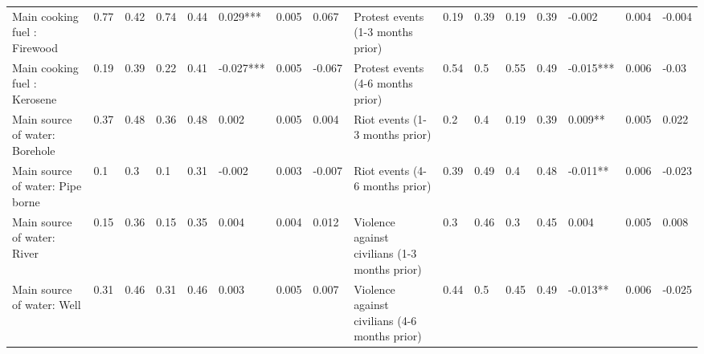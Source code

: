 \begin{table}[H]
{\begin{tabular}{@{}llllllll|llllllll@{}}
Main cooking fuel : Firewood & 0.77 & 0.42 & 0.74 & 0.44 & 0.029*** & 0.005 & 0.067 & Protest events (1-3 months prior) & 0.19 & 0.39 & 0.19 & 0.39 & -0.002 & 0.004 & -0.004 \\
Main cooking fuel : Kerosene & 0.19 & 0.39 & 0.22 & 0.41 & -0.027*** & 0.005 & -0.067 & Protest events (4-6 months prior) & 0.54 & 0.5 & 0.55 & 0.49 & -0.015*** & 0.006 & -0.03 \\
Main source of water: Borehole & 0.37 & 0.48 & 0.36 & 0.48 & 0.002 & 0.005 & 0.004 & Riot events (1-3 months prior) & 0.2 & 0.4 & 0.19 & 0.39 & 0.009** & 0.005 & 0.022 \\
Main source of water: Pipe borne & 0.1 & 0.3 & 0.1 & 0.31 & -0.002 & 0.003 & -0.007 & Riot events (4-6 months prior) & 0.39 & 0.49 & 0.4 & 0.48 & -0.011** & 0.006 & -0.023 \\
Main source of water: River & 0.15 & 0.36 & 0.15 & 0.35 & 0.004 & 0.004 & 0.012 & Violence against civilians (1-3 months prior) & 0.3 & 0.46 & 0.3 & 0.45 & 0.004 & 0.005 & 0.008 \\
Main source of water: Well & 0.31 & 0.46 & 0.31 & 0.46 & 0.003 & 0.005 & 0.007 & Violence against civilians (4-6 months prior) & 0.44 & 0.5 & 0.45 & 0.49 & -0.013** & 0.006 & -0.025 \\
\bottomrule
\end{tabular}%
}
\end{table}
